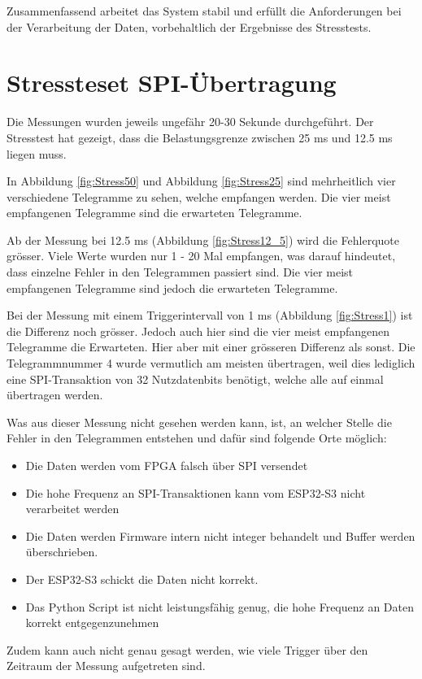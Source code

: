 Zusammenfassend arbeitet das System stabil und erfüllt die Anforderungen bei der Verarbeitung der Daten, vorbehaltlich der Ergebnisse des Stresstests.

\section{Stressteset SPI-Übertragung}
\label{sec:DiskStresstest}
Die Messungen wurden jeweils ungefähr 20-30 Sekunde durchgeführt. Der Stresstest hat gezeigt, dass die Belastungsgrenze zwischen 25 ms und 12.5 ms liegen muss. 

In Abbildung \ref{fig:Stress50} und Abbildung \ref{fig:Stress25} sind mehrheitlich vier verschiedene Telegramme zu sehen, welche empfangen werden. Die vier meist empfangenen Telegramme sind die erwarteten Telegramme.

Ab der Messung bei 12.5 ms (Abbildung \ref{fig:Stress12_5}) wird die Fehlerquote grösser. Viele Werte wurden nur 1 - 20 Mal empfangen, was darauf hindeutet, dass einzelne Fehler in den Telegrammen passiert sind. Die vier meist empfangenen Telegramme sind jedoch die erwarteten Telegramme.


Bei der Messung mit einem Triggerintervall von 1 ms (Abbildung \ref{fig:Stress1}) ist die Differenz noch grösser. Jedoch auch hier sind die vier meist empfangenen Telegramme die Erwarteten. Hier aber mit einer grösseren Differenz als sonst. Die Telegrammnummer 4 wurde vermutlich am meisten übertragen, weil dies lediglich eine SPI-Transaktion von 32 Nutzdatenbits benötigt, welche alle auf einmal übertragen werden. 

Was aus dieser Messung nicht gesehen werden kann, ist, an welcher Stelle die Fehler in den Telegrammen entstehen und dafür sind folgende Orte möglich:
\begin{itemize}[]
    \item Die Daten werden vom FPGA falsch über SPI versendet
    \item Die hohe Frequenz an SPI-Transaktionen kann vom ESP32-S3 nicht verarbeitet werden
    \item Die Daten werden Firmware intern nicht integer behandelt und Buffer werden überschrieben.
    \item Der ESP32-S3 schickt die Daten nicht korrekt.
    \item Das Python Script ist nicht leistungsfähig genug, die hohe Frequenz an Daten korrekt entgegenzunehmen
\end{itemize}

Zudem kann auch nicht genau gesagt werden, wie viele Trigger über den Zeitraum der Messung aufgetreten sind.

